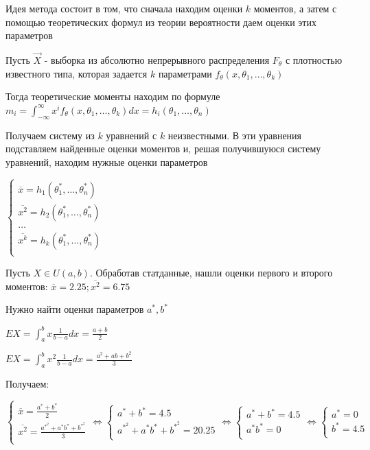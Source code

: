 \begin{enumerate}
    Идея метода состоит в том, что сначала находим оценки $k$ моментов, а затем с помощью теоретических формул
    из теории вероятности даем оценки этих параметров

    Пусть $\vec{X}$ - выборка из абсолютно непрерывного распределения $F_\theta$ с плотностью известного типа, 
    которая задается $k$ параметрами $f_\theta (x, \theta_1, \dots, \theta_k)$

    Тогда теоретические моменты находим по формуле $m_i = \int_{-\infty}^{\infty} x^i f_\theta (x, \theta_1, \dots, \theta_k) dx = h_i(\theta_1, \dots, \theta_n)$

    Получаем систему из $k$ уравнений с $k$ неизвестными. В эти уравнения подставляем найденные оценки
    моментов и, решая получившуюся систему уравнений, находим нужные оценки параметров

    $\begin{cases}
    \overline{x} = h_1(\theta_1^*, \dots, \theta_n^*) \\ 
    \overline{x^2} = h_2(\theta_1^*, \dots, \theta_n^*) \\ 
    \dots \\
    \overline{x^k} = h_k(\theta_1^*, \dots, \theta_n^*) \\ 
    \end{cases}$

    \Ex Пусть $X \in U(a, b)$. Обработав статданные, нашли оценки первого и второго моментов: $\overline{x} = 2.25; \overline{x^2} = 6.75$

    Нужно найти оценки параметров $a^*, b^*$

    $EX = \int_a^b x \frac{1}{b - a} dx = \frac{a + b}{2}$

    $EX = \int_a^b x^2 \frac{1}{b - a} dx = \frac{a^2 + ab + b^2}{3}$

    Получаем:

    $\begin{cases}
        \overline{x} = \frac{a^* + b^*}{2} \\ 
        \overline{x^2} = \frac{a^*^2 + a^* b^* + b^*^2}{3} \\ 
    \end{cases} \Longleftrightarrow \begin{cases}
        a^* + b^* = 4.5 \\ 
        a^*^2 + a^* b^* + b^*^2 = 20.25 \\ 
    \end{cases} \Longleftrightarrow \begin{cases}
        a^* + b^* = 4.5 \\ 
        a^* b^* = 0 \\ 
    \end{cases} \Longleftrightarrow \begin{cases}
        a^* = 0 \\ 
        b^* = 4.5 \\ 
    \end{cases}$


\end{enumerate}
